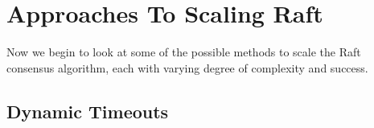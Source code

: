 \section{Approaches To Scaling Raft}

Now we begin to look at some of the possible methods to scale the Raft consensus algorithm, each with varying degree of complexity and success.

\subsection{Dynamic Timeouts}